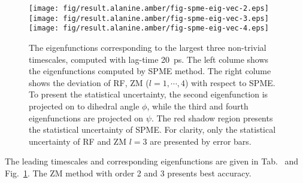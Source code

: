 \documentclass[aip,jcp,a4paper,preprint,unsortedaddress,onecolumn,fleqn]{revtex4-1}
\begin{document}
\begin{figure}
  \centering
  \texttt{[image: fig/result.alanine.amber/fig-spme-eig-vec-2.eps]}
  \\
  \texttt{[image: fig/result.alanine.amber/fig-spme-eig-vec-3.eps]}
  \\
  \texttt{[image: fig/result.alanine.amber/fig-spme-eig-vec-4.eps]}
  \\
  \caption{The eigenfunctions corresponding to the largest three
    non-trivial timescales, computed with lag-time 20~ps.  The left
    colume shows the eigenfunctions computed by SPME method. The right colume
    shows the deviation of RF, ZM ($l=1,\cdots,4$) with respect to
    SPME.  To present the statistical uncertainty, the second
    eigenfunction is projected on to dihedral angle $\phi$, while the
    third and fourth eigenfunctions are projected on $\psi$.  The red
    shadow region presents the statistical uncertainty of SPME. For
    clarity, only the statistical uncertainty of RF and ZM $l=3$ are
    presented by error bars.  }
  \label{fig:tmp5}
\end{figure}


The leading timescales and corresponding eigenfunctions are given in
Tab.~\label{tab:tmp3} and Fig.~\ref{fig:tmp5}. The ZM method with
order 2 and 3 presents best accuracy.



\newpage
{}

\end{document}
